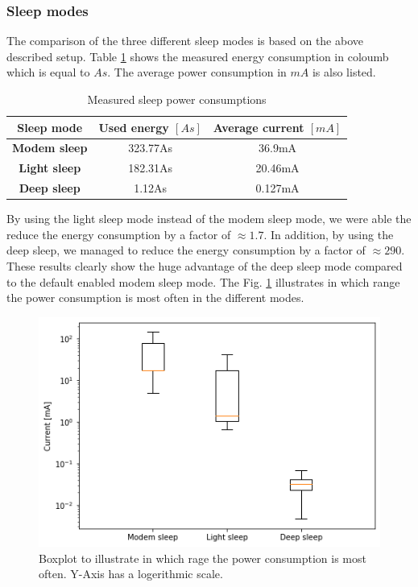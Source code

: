 \subsubsection{Sleep modes}
The comparison of the three different sleep modes is based on the above described setup.
Table \ref{tab:sleep_modes_15min} shows the measured energy consumption in coloumb which is equal to $As$.
The average power consumption in $mA$ is also listed.

\begin{table}[htbp]
\caption{Measured sleep power consumptions}
\begin{center}
\begin{tabular}{|c|c|c|}
\hline
\textbf{Sleep mode}&\textbf{Used energy $[As]$}&\textbf{Average current $[mA]$}\\
\hline
\textbf{Modem sleep} & 323.77As & 36.9mA\\
\textbf{Light sleep} & 182.31As & 20.46mA\\
\textbf{Deep sleep}  & 1.12As   & 0.127mA\\
\hline
\end{tabular}
\label{tab:sleep_modes_15min}
\end{center}
\end{table}

By using the light sleep mode instead of the modem sleep mode, we were able the reduce the energy consumption by a factor of $\approx 1.7$.
In addition, by using the deep sleep, we managed to reduce the energy consumption by a factor of $\approx 290$.
These results clearly show the huge advantage of the deep sleep mode compared to the default enabled modem sleep mode.
The Fig. \ref{fig:sleep_compare_boxplot} illustrates in which range the power consumption is most often in the different modes.

\begin{figure}[h]
    \includegraphics[width = \linewidth]{fig/sleep_compare_boxplot.png}
    \caption{Boxplot to illustrate in which rage the power consumption is most often. Y-Axis has a logerithmic scale.}
    \label{fig:sleep_compare_boxplot}
\end{figure}